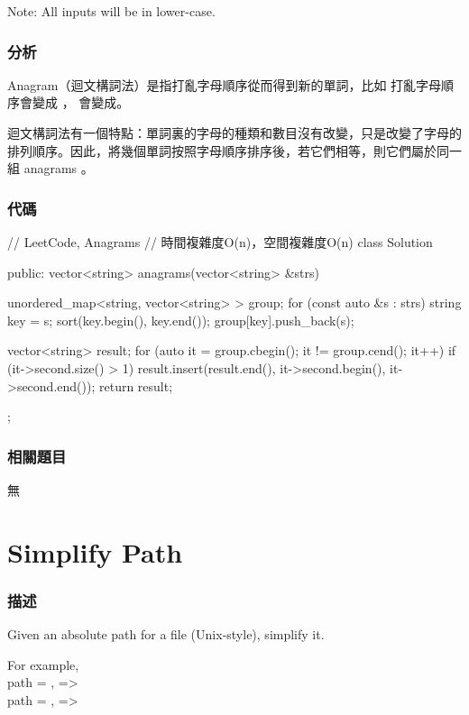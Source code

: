 Note: All inputs will be in lower-case.


\subsubsection{分析}
Anagram（迴文構詞法）是指打亂字母順序從而得到新的單詞，比如  打亂字母順序會變成  ， 會變成。

迴文構詞法有一個特點：單詞裏的字母的種類和數目沒有改變，只是改變了字母的排列順序。因此，將幾個單詞按照字母順序排序後，若它們相等，則它們屬於同一組 anagrams 。


\subsubsection{代碼}
\begin{Code}
// LeetCode, Anagrams
// 時間複雜度O(n)，空間複雜度O(n)
class Solution {
public:
    vector<string> anagrams(vector<string> &strs) {
        unordered_map<string, vector<string> > group;
        for (const auto &s : strs) {
            string key = s;
            sort(key.begin(), key.end());
            group[key].push_back(s);
        }

        vector<string> result;
        for (auto it = group.cbegin(); it != group.cend(); it++) {
            if (it->second.size() > 1)
                result.insert(result.end(), it->second.begin(), it->second.end());
        }
        return result;
    }
};
\end{Code}


\subsubsection{相關題目}
\begindot
\item 無
\myenddot


\section{Simplify Path} %
\label{sec:simplify-path}


\subsubsection{描述}
Given an absolute path for a file (Unix-style), simplify it.

For example, \\
path = , =>  \\
path = , =>  \\

